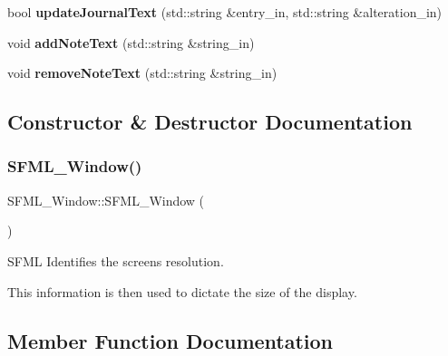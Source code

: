 \begin{DoxyCompactItemize}
\item 
\mbox{\label{class_s_f_m_l___window_a5342bdf2e47c7da13c12b6e10adb93df}} 
bool {\bfseries update\+Journal\+Text} (std\+::string \&entry\+\_\+in, std\+::string \&alteration\+\_\+in)
\item 
\mbox{\label{class_s_f_m_l___window_aabddeb0f0d1ee5a68f3ab81c48e37a6d}} 
void {\bfseries add\+Note\+Text} (std\+::string \&string\+\_\+in)
\item 
\mbox{\label{class_s_f_m_l___window_a14b3b13c557e1296513c8b37e805bb99}} 
void {\bfseries remove\+Note\+Text} (std\+::string \&string\+\_\+in)
\end{DoxyCompactItemize}


\subsection{Constructor \& Destructor Documentation}
\mbox{\label{class_s_f_m_l___window_a590949c104b8bff7d97db0db88bc5e54}} 
\subsubsection{\texorpdfstring{S\+F\+M\+L\+\_\+\+Window()}{SFML\_Window()}}
{\footnotesize\ttfamily S\+F\+M\+L\+\_\+\+Window\+::\+S\+F\+M\+L\+\_\+\+Window (\begin{DoxyParamCaption}{ }\end{DoxyParamCaption})}

S\+F\+ML Identifies the screen\textquotesingle{}s resolution.

This information is then used to dictate the size of the display. 

\subsection{Member Function Documentation}
\mbox{\label{class_s_f_m_l___window_a9ebb1be5a71a001270bb42a65e4a7a29}} 
